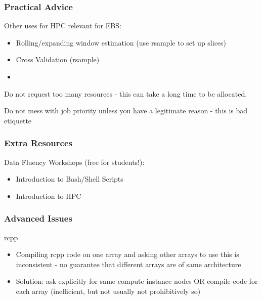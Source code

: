 \documentclass[aspectratio=169,notheorems]{beamer}
\theoremstyle{plain}
\theoremstyle{plain}
\numberwithin{equation}{section}
\begin{document}
\begin{frame}
\frametitle{Practical Advice}
Other uses for HPC relevant for EBS:
\begin{itemize}
\item Rolling/expanding window estimation (use rsample to set up slices)
\item Cross Validation (rsample)
\item 
\end{itemize}

Do not request too many resources - this can take a long time to be allocated.

Do not mess with job priority unless you have a legitimate reason - this is bad etiquette
\end{frame}

\begin{frame}
\frametitle{Extra Resources}
Data Fluency Workshops (free for students!):
\begin{itemize}
\item Introduction to Bash/Shell Scripts
\item Introduction to HPC
\end{itemize}
\end{frame}

\begin{frame}
\frametitle{Advanced Issues}
rcpp
\begin{itemize}
\item Compiling rcpp code on one array and asking other arrays to use this is inconsistent - no guarantee that different arrays are of same architecture
\item Solution: ask explicitly for same compute instance nodes OR compile code for each array (inefficient, but not usually not prohibitively so)
\end{itemize}
\end{frame}
\end{document}
